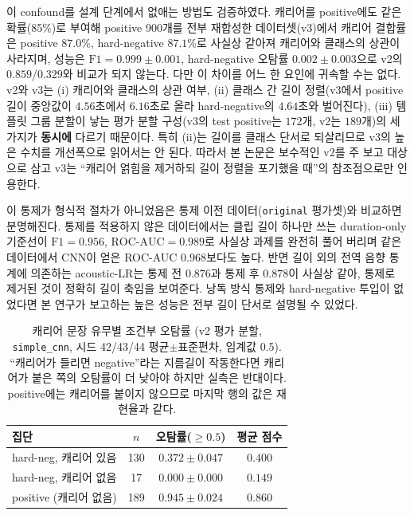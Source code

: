 \documentclass[10pt,twocolumn]{article}
\renewcommand{\emph}[1]{\textbf{#1}}
\begin{document}
이 confound를 설계 단계에서 없애는 방법도 검증하였다. 캐리어를 positive에도 같은 확률(85\%)로
부여해 positive 900개를 전부 재합성한 데이터셋(v3)에서 캐리어 결합률은 positive $87.0\%$,
hard-negative $87.1\%$로 사실상 같아져 캐리어와 클래스의 상관이 사라지며, 성능은
$\text{F1}=0.999\pm0.001$, hard-negative 오탐률 $0.002\pm0.003$으로 v2의 $0.859$/$0.329$와
비교가 되지 않는다. 다만 이 차이를 어느 한 요인에 귀속할 수는 없다. v2와 v3는 (i) 캐리어와
클래스의 상관 여부, (ii) 클래스 간 길이 정렬(v3에서 positive 길이 중앙값이 $4.56$초에서
$6.16$초로 올라 hard-negative의 $4.64$초와 벌어진다), (iii) 템플릿 그룹 분할이 낳는 평가 분할
구성(v3의 test positive는 $172$개, v2는 $189$개)의 세 가지가 \emph{동시에} 다르기 때문이다.
특히 (ii)는 길이를 클래스 단서로 되살리므로 v3의 높은 수치를 개선폭으로 읽어서는 안 된다.
따라서 본 논문은 보수적인 v2를 주 보고 대상으로 삼고 v3는 ``캐리어 얽힘을 제거하되 길이 정렬을
포기했을 때''의 참조점으로만 인용한다.

이 통제가 형식적 절차가 아니었음은 통제 이전 데이터(\texttt{original} 평가셋)와 비교하면
분명해진다. 통제를 적용하지 않은 데이터에서는 클립 길이 하나만 쓰는 duration-only 기준선이
$\text{F1}=0.956$, $\text{ROC-AUC}=0.989$로 사실상 과제를 완전히 풀어 버리며 같은 데이터에서
CNN이 얻은 ROC-AUC $0.968$보다도 높다. 반면 길이 외의 전역 음향 통계에 의존하는 acoustic-LR는
통제 전 $0.876$과 통제 후 $0.878$이 사실상 같아, 통제로 제거된 것이 정확히 길이 축임을
보여준다. 낭독 방식 통제와 hard-negative 투입이 없었다면 본 연구가 보고하는 높은 성능은 전부
길이 단서로 설명될 수 있었다.

\begin{table}[!t]
\centering
\caption{캐리어 문장 유무별 조건부 오탐률 (v2 평가 분할, \texttt{simple\_cnn}, 시드 42/43/44
평균$\pm$표준편차, 임계값 0.5). ``캐리어가 들리면 negative''라는 지름길이 작동한다면 캐리어가
붙은 쪽의 오탐률이 더 낮아야 하지만 실측은 반대이다. positive에는 캐리어를 붙이지 않으므로
마지막 행의 값은 재현율과 같다.}
\label{tab:carrier}
\footnotesize
\setlength{\tabcolsep}{4pt}
\begin{tabular}{lccc}
\toprule
집단 & $n$ & 오탐률($\ge 0.5$) & 평균 점수 \\
\midrule
hard-neg, 캐리어 있음 & 130 & $0.372\pm0.047$ & $0.400$ \\
hard-neg, 캐리어 없음 & 17  & $\mathbf{0.000\pm0.000}$ & $0.149$ \\
positive (캐리어 없음) & 189 & $0.945\pm0.024$ & $0.860$ \\
\bottomrule
\end{tabular}
\end{table}
\end{document}
